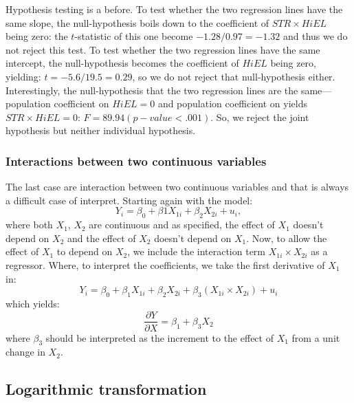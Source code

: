 \documentclass[
]{book}
\begin{document}
Hypothesis testing is a before. To test whether the two regression lines have the same slope, the null-hypothesis boils down to the coefficient of \(STR \times HiEL\) being zero: the \(t\)-statistic of this one become \(-1.28/0.97 = -1.32\) and thus we do not reject this test. To test whether the two regression lines have the same intercept, the null-hypothesis becomes the coefficient of \(HiEL\) being zero, yielding: \(t = -5.6/19.5 = 0.29\), so we do not reject that null-hypothesis either. Interestingly, the null-hypothesis that the two regression lines are the same---population coefficient on \(HiEL = 0\) and population coefficient on yields \(STR \times HiEL = 0\): \(F = 89.94 (p-value < .001)\). So, we reject the joint hypothesis but neither individual hypothesis.

\hypertarget{interactions-between-two-continuous-variables}{%
\subsubsection{Interactions between two continuous variables}\label{interactions-between-two-continuous-variables}}

The last case are interaction between two continuous variables and that is always a difficult case of interpret. Starting again with the model:
\begin{equation}
Y_i =\beta_0 + \beta1 X_{1i} +\beta_2 {X_{2i}} +u_i,
\end{equation}
where both \(X_1\), \(X_2\) are continuous and as specified, the effect of \(X_1\) doesn't depend on \(X_2\) and the effect of \(X_2\) doesn't depend on \(X_1\). Now, to allow the effect of \(X_1\) to depend on \(X_2\), we include the interaction term \(X_{1i} \times X_{2i}\) as a regressor. Where, to interpret the coefficients, we take the first derivative of \(X_1\) in:
\begin{equation}
Y_i = \beta_0 + \beta_1 X_{1i} + \beta_2 X_{2i} + \beta_3 (X_{1i}
\times X_{2i}) + u_i
\end{equation}
which yields:
\begin{equation}
\frac{\partial Y}{\partial X} = \beta_1 + \beta_3 X_2
\end{equation}
where \(\beta_3\) should be interpreted as the increment to the effect of \(X_1\) from a unit change in \(X_2\).

\hypertarget{logarithmic-transformation}{%
\subsection{Logarithmic transformation}\label{logarithmic-transformation}}
\end{document}
